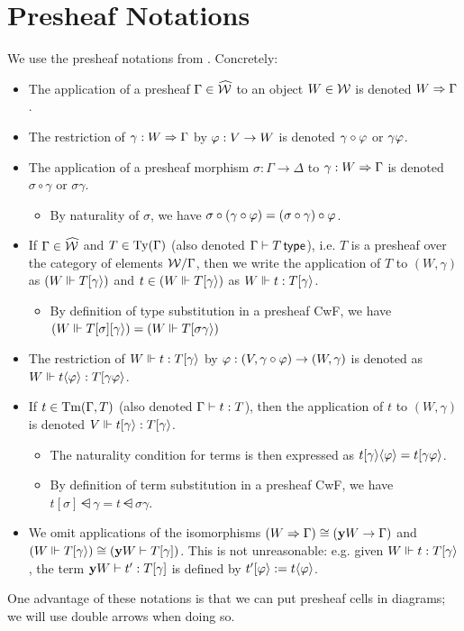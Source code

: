 \documentclass[a4paper]{memoir}
\begin{document}
\section{Presheaf Notations}
\label{sec:notations}
\label{sec:notations:psh}
We use the presheaf notations from \cite{reldtt-techreport}. Concretely:
\begin{itemize}
	\item The application of a presheaf $\Gamma \in \widehat {{\mathcal{W}}}$ to an object $W \in {\mathcal{W}}$ is denoted $W \Rightarrow \Gamma$.
	\item The restriction of $\gamma : W \Rightarrow \Gamma$ by $\varphi : V \to W$ is denoted $\gamma \circ \varphi$ or $\gamma \varphi$.
	\item The application of a presheaf morphism $\sigma : \Gamma \to \Delta$ to $\gamma : W \Rightarrow \Gamma$ is denoted $\sigma \circ \gamma$ or $\sigma \gamma$.
	\begin{itemize}
		\item By naturality of $\sigma$, we have $\sigma \circ (\gamma \circ \varphi) = (\sigma \circ \gamma) \circ \varphi$.
	\end{itemize}
	\item If $\Gamma \in \widehat {{\mathcal{W}}}$ and $T \in {\mathrm{Ty}}(\Gamma)$ (also denoted $\Gamma \vdash T \,\mathsf{type}$), i.e. $T$ is a presheaf over the category of elements ${\mathcal{W}}/\Gamma$, then we write the application of $T$ to $(W, \gamma)$ as $(W \mathrel{\Vdash} T [ \gamma \rangle)$ and $t \in (W \mathrel{\Vdash} T [ \gamma \rangle)$ as $W \mathrel{\Vdash} t : T [ \gamma \rangle$.
	\begin{itemize}
		\item By definition of type substitution in a presheaf CwF, we have $(W \mathrel{\Vdash} T[\sigma] [ \gamma \rangle) = (W \mathrel{\Vdash} T [ \sigma \gamma \rangle)$
	\end{itemize}
	\item The restriction of $W \mathrel{\Vdash} t : T [ \gamma \rangle$ by $\varphi : (V, \gamma \circ \varphi) \to (W, \gamma)$ is denoted as $W \mathrel{\Vdash} t \langle \varphi \rangle : T [ \gamma \varphi \rangle$.
	\item If $t \in {\mathrm{Tm}}(\Gamma, T)$ (also denoted $\Gamma \vdash t : T$), then the application of $t$ to $(W, \gamma)$ is denoted $V \mathrel{\Vdash} t [ \gamma \rangle : T [ \gamma \rangle$.
	\begin{itemize}
		\item The naturality condition for terms is then expressed as $t [ \gamma \rangle \langle \varphi \rangle = t [ \gamma \varphi \rangle$.
		\item By definition of term substitution in a presheaf CwF, we have $t[\sigma] \dsub \gamma = t \dsub{\sigma \gamma}$.
	\end{itemize}
	\item We omit applications of the isomorphisms $(W \Rightarrow \Gamma) \cong ({\mathbf{y}} W \to \Gamma)$ and $(W \mathrel{\Vdash} T [ \gamma \rangle) \cong ({\mathbf{y}} W \vdash T [\gamma])$.
	This is not unreasonable: e.g. given $W \mathrel{\Vdash} t : T [ \gamma \rangle$, the term ${\mathbf{y}} W \vdash t' : T[\gamma]$ is defined by $t' [ \varphi \rangle := t \langle \varphi \rangle$.
\end{itemize}
One advantage of these notations is that we can put presheaf cells in diagrams; we will use double arrows when doing so.
\end{document}
